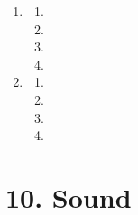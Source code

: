 \begin{enumerate}[itemsep=6pt, label=\textbf{\arabic*}.]
  \item %

    \begin{enumerate}[noitemsep, label=\textbf{(\alph*)} ]
    \item %
    \item %
    \item %
\item %
    \end{enumerate}

  \item %

    \begin{enumerate}[noitemsep, label=\textbf{(\alph*)} ]
    \item %
    \item %
    \item %
    \item %
    \end{enumerate}

  \end{enumerate}


\section {10. Sound}
